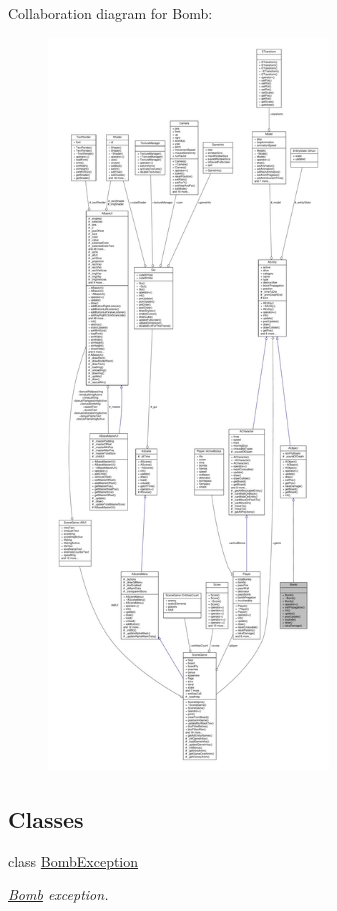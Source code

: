 Collaboration diagram for Bomb\+:
\nopagebreak
\begin{figure}[H]
\begin{center}
\leavevmode
\includegraphics[height=550pt]{class_bomb__coll__graph}
\end{center}
\end{figure}
\subsection*{Classes}
\begin{DoxyCompactItemize}
\item 
class \hyperlink{class_bomb_1_1_bomb_exception}{Bomb\+Exception}
\begin{DoxyCompactList}\small\item\em \hyperlink{class_bomb}{Bomb} exception. \end{DoxyCompactList}\end{DoxyCompactItemize}
